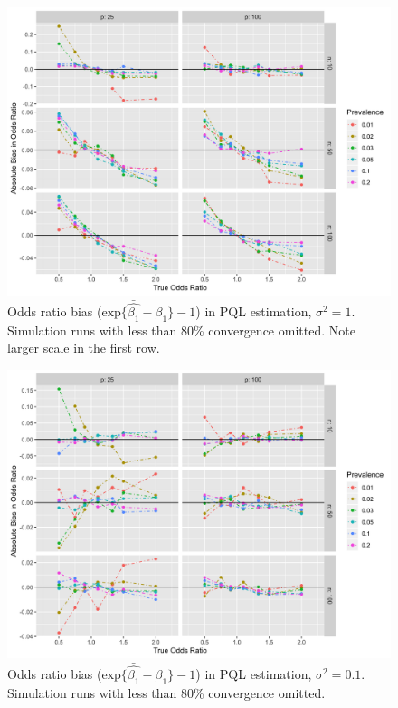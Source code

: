 \documentclass[Afour,times,sagev,doublespace]{sagej}
\begin{document}
\begin{figure}
\centering
\includegraphics[width=\linewidth]{_bias_pql_sbs1.png}
  \caption{Odds ratio bias ($\text{exp} \{ \bar{\hat{\beta_1}} - \beta_1 \}-1$) in PQL estimation, $\sigma^2=1$. Simulation runs with less than 80\% convergence omitted. Note larger scale in the first row.}
    \label{fig:_bias_pql_6}
\end{figure}

\begin{figure}
\centering
\includegraphics[width=\linewidth]{_bias_pql_sbspt1.png}
  \caption{Odds ratio bias ($\text{exp} \{ \bar{\hat{\beta_1}} - \beta_1 \} - 1$) in PQL estimation, $\sigma^2=0.1$. Simulation runs with less than 80\% convergence omitted.}
    \label{fig:_bias_pql_sbs_pt1}
\end{figure}
\end{document}
